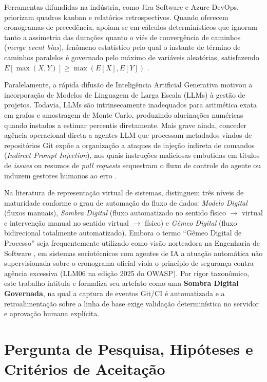 \documentclass[12pt,openany,oneside,a4paper,english,brazilian,sumario=tradicional]{abntex2}
\begin{document}
Ferramentas difundidas na indústria, como Jira Software e Azure DevOps, priorizam quadros kanban e relatórios retrospectivos. Quando oferecem cronogramas de precedência, apoiam-se em cálculos determinísticos que ignoram tanto a assimetria das durações quanto o viés de convergência de caminhos (\textit{merge event bias}), fenômeno estatístico pelo qual o instante de término de caminhos paralelos é governado pelo máximo de variáveis aleatórias, satisfazendo $E[\max(X,Y)] \ge \max(E[X],E[Y])$ \cite{vanslyke1963,maccrimmon1964}.

Paralelamente, a rápida difusão de Inteligência Artificial Generativa motivou a incorporação de Modelos de Linguagem de Larga Escala (LLMs) à gestão de projetos. Todavia, LLMs são intrinsecamente inadequados para aritmética exata em grafos e amostragem de Monte Carlo, produzindo alucinações numéricas quando instados a estimar percentis diretamente. Mais grave ainda, conceder agência operacional direta a agentes LLM que processam metadados vindos de repositórios Git expõe a organização a ataques de injeção indireta de comandos (\textit{Indirect Prompt Injection}), nos quais instruções maliciosas embutidas em títulos de \textit{issues} ou resumos de \textit{pull requests} sequestram o fluxo de controle do agente ou induzem gestores humanos ao erro \cite{greshake2023,owasp2023,owasp2025,debenedetti2024}.

Na literatura de representação virtual de sistemas,  distinguem três níveis de maturidade conforme o grau de automação do fluxo de dados: \textit{Modelo Digital} (fluxos manuais), \textit{Sombra Digital} (fluxo automatizado no sentido físico $\rightarrow$ virtual e intervenção manual no sentido virtual $\rightarrow$ físico) e \textit{Gêmeo Digital} (fluxo bidirecional totalmente automatizado). Embora o termo ``Gêmeo Digital de Processo'' seja frequentemente utilizado como visão norteadora na Engenharia de Software \cite{guinea2024}, em sistemas sociotécnicos com agentes de IA a atuação automática não supervisionada sobre o cronograma oficial viola o princípio de segurança contra agência excessiva (LLM06 na edição 2025 do OWASP). Por rigor taxonômico, este trabalho intitula e formaliza seu artefato como uma \textbf{Sombra Digital Governada}, na qual a captura de eventos Git/CI é automatizada e a retroalimentação sobre a linha de base exige validação determinística no servidor e aprovação humana explícita.

\section{Pergunta de Pesquisa, Hipóteses e Critérios de Aceitação}
\end{document}
